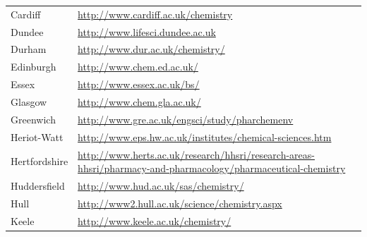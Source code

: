 \begin{tabular}{||l|l}
 Cardiff                            & \url{http://www.cardiff.ac.uk/chemistry}                                                                                                   \\
 Dundee                             & \url{http://www.lifesci.dundee.ac.uk}                                                                                                      \\
 Durham                             & \url{http://www.dur.ac.uk/chemistry/}                                                                                                      \\
 Edinburgh                          & \url{http://www.chem.ed.ac.uk/}                                                                                                            \\
 Essex                              & \url{http://www.essex.ac.uk/bs/}                                                                                                           \\
 Glasgow                            & \url{http://www.chem.gla.ac.uk/}                                                                                                           \\
 Greenwich                          & \url{http://www.gre.ac.uk/engsci/study/pharchemenv}                                                                                        \\
 Heriot-Watt                        & \url{http://www.eps.hw.ac.uk/institutes/chemical-sciences.htm}                                                                             \\
 Hertfordshire                      & \url{http://www.herts.ac.uk/research/hhsri/research-areas-hhsri/pharmacy-and-pharmacology/pharmaceutical-chemistry}                        \\
 Huddersfield                       & \url{http://www.hud.ac.uk/sas/chemistry/}                                                                                                  \\
 Hull                               & \url{http://www2.hull.ac.uk/science/chemistry.aspx}                                                                                        \\
 Keele                              & \url{http://www.keele.ac.uk/chemistry/}                                                                                                    \\

\end{tabular}
